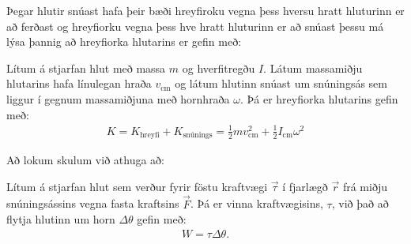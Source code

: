 \ifdefined \wholebook \else\documentclass[oneside]{book}\usepackage{EdlBook}\graphicspath{{figures/}}
\begin{document}
Þegar hlutir snúast hafa þeir bæði hreyfiroku vegna þess hversu hratt hluturinn er að ferðast og hreyfiorku vegna þess hve hratt hluturinn er að snúast þessu má lýsa þannig að hreyfiorka hlutarins er gefin með:

\begin{tcolorbox}
\begin{definition}
Lítum á stjarfan hlut með massa $m$ og hverfitregðu $I$. Látum massamiðju hlutarins hafa línulegan hraða $v_{\text{cm}}$ og látum hlutinn snúast um snúningsás sem liggur í gegnum massamiðjuna með hornhraða $\omega$. Þá er hreyfiorka hlutarins gefin með:
\begin{align*}
    K = K_{\text{hreyfi}} + K_{\text{snúnings}} = \frac{1}{2}mv_{\text{cm}}^2 + \frac{1}{2}I_{\text{cm}}\omega^2
\end{align*}
\end{definition}
\end{tcolorbox}

Að lokum skulum við athuga að:

\begin{tcolorbox}
\begin{theorem}
Lítum á stjarfan hlut sem verður fyrir föstu kraftvægi $\vec{\tau}$ í fjarlægð $\vec{r}$ frá miðju snúningsássins vegna fasta kraftsins $\vec{F}$. Þá er vinna kraftvægisins, $\tau$, við það að flytja hlutinn um horn $\Delta \theta$ gefin með:
\begin{align*}
    W = \tau \Delta \theta.
\end{align*}
\end{theorem}
\end{tcolorbox}
\end{document}
